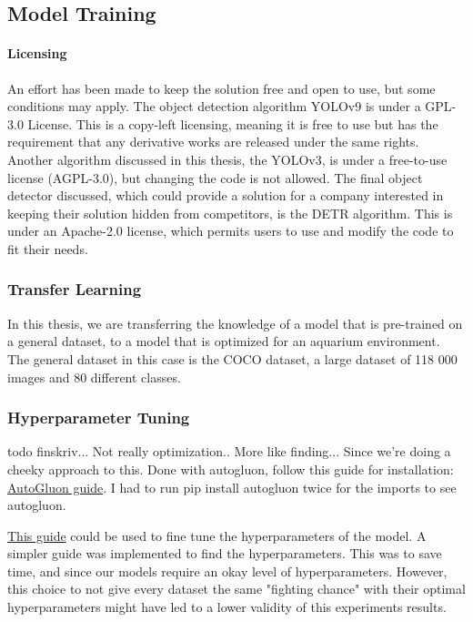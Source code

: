 \subsection{Model Training}
\label{sec:model_training}


\paragraph{Licensing}
An effort has been made to keep the solution free and open to use, but some conditions may apply. The object detection algorithm YOLOv9 is under a GPL-3.0 License. This is a copy-left licensing, meaning it is free to use but has the requirement that any derivative works are released under the same rights. Another algorithm discussed in this thesis, the YOLOv3, is under a free-to-use license (AGPL-3.0), but changing the code is not allowed. The final object detector discussed, which could provide a solution for a company interested in keeping their solution hidden from competitors, is the DETR algorithm. This is under an Apache-2.0 license, which permits users to use and modify the code to fit their needs.

\subsubsection{Transfer Learning}
In this thesis, we are transferring the knowledge of a model that is pre-trained on a general dataset, to a model that is optimized for an aquarium environment. The general dataset in this case is the COCO dataset, a large dataset of 118 000 images and 80 different classes.

\subsubsection{Hyperparameter Tuning}
todo finskriv... Not really optimization.. More like finding... Since we're doing a cheeky approach to this. Done with autogluon, follow this guide for installation: \href{https://auto.gluon.ai/stable/install.html}{AutoGluon guide}. I had to run pip install autogluon twice for the imports to see autogluon.

\href{https://auto.gluon.ai/scoredebugweight/tutorials/course/script.html}{This guide} could be used to fine tune the hyperparameters of the model. A simpler guide was implemented to find the hyperparameters. This was to save time, and since our models require an okay level of hyperparameters. However, this choice to not give every dataset the same "fighting chance" with their optimal hyperparameters might have led to a lower validity of this experiments results.

